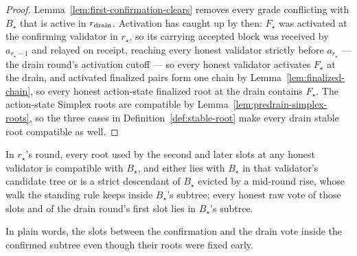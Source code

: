 \begin{proof}
Lemma~\ref{lem:first-confirmation-clears} removes every grade conflicting
with \(B_\star\) that is active in \(r_{\rm drain}\).  Activation has
caught up by then: \(F_\star\) was activated at the confirming validator
in \(r_\star\), so its carrying accepted block was received by
\(a_{r_\star-1}\) and relayed on receipt, reaching every honest
validator strictly before \(a_{r_\star}\) --- the drain round's
activation cutoff --- so every honest validator activates \(F_\star\) at
the drain, and activated finalized pairs form one chain by
Lemma~\ref{lem:finalized-chain}, so every honest action-state finalized
root at the drain contains \(F_\star\).  The action-state Simplex roots are
compatible by Lemma~\ref{lem:predrain-simplex-roots}, so the three cases in
Definition~\ref{def:stable-root} make every drain stable root compatible as
well.
\end{proof}

\begin{lemma}
\label{lem:confirmation-round-slots}
In \(r_\star\)'s round, every root used by the second and later
slots at any honest validator is compatible with \(B_\star\), and
either lies with \(B_\star\) in that validator's candidate tree or
is a strict descendant of \(B_\star\) evicted by a mid-round rise,
whose walk the standing rule keeps inside \(B_\star\)'s subtree;
every honest raw vote of those slots and of the drain round's first
slot lies in \(B_\star\)'s subtree.

In plain words, the slots between the confirmation and the drain vote
inside the confirmed subtree even though their roots were fixed early.
\end{lemma}

